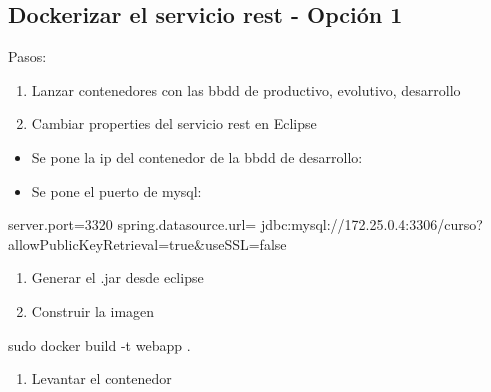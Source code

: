 \documentclass[
]{article}
\newenvironment{Shaded}{\begin{snugshade}}{\end{snugshade}}
\newcommand{\AttributeTok}[1]{\textcolor[rgb]{0.49,0.56,0.16}{#1}}
\newcommand{\FunctionTok}[1]{\textcolor[rgb]{0.02,0.16,0.49}{#1}}
\newcommand{\NormalTok}[1]{#1}
\providecommand{\tightlist}{%
  \setlength{\itemsep}{0pt}\setlength{\parskip}{0pt}}
\let\oldtexttt\texttt
\renewcommand{\texttt}[1]{
    \tcbox{\oldtexttt{#1}} 
}
\begin{document}
\hypertarget{dockerizar-el-servicio-rest---opciuxf3n-1}{%
\subsection{Dockerizar el servicio rest - Opción
1}\label{dockerizar-el-servicio-rest---opciuxf3n-1}}

Pasos:

\begin{enumerate}
\def\labelenumi{\arabic{enumi}.}
\tightlist
\item
  Lanzar contenedores con las bbdd de productivo, evolutivo, desarrollo
\item
  Cambiar properties del servicio rest en Eclipse
\end{enumerate}

\begin{itemize}
\tightlist
\item
  Se pone la ip del contenedor de la bbdd de desarrollo:
  \texttt{172.25.0.4}
\item
  Se pone el puerto de mysql: \texttt{3306}
\end{itemize}

\begin{Shaded}
\begin{Highlighting}[]
\NormalTok{server.port=3320}
\NormalTok{spring.datasource.url= jdbc:mysql://172.25.0.4:3306/curso?allowPublicKeyRetrieval=true\&useSSL=false}
\end{Highlighting}
\end{Shaded}

\begin{enumerate}
\def\labelenumi{\arabic{enumi}.}
\setcounter{enumi}{2}
\tightlist
\item
  Generar el .jar desde eclipse
\item
  Construir la imagen
\end{enumerate}

\begin{Shaded}
\begin{Highlighting}[]
\FunctionTok{sudo}\NormalTok{ docker build }\AttributeTok{{-}t}\NormalTok{ webapp .}
\end{Highlighting}
\end{Shaded}

\begin{enumerate}
\def\labelenumi{\arabic{enumi}.}
\setcounter{enumi}{4}
\tightlist
\item
  Levantar el contenedor
\end{enumerate}
\end{document}
